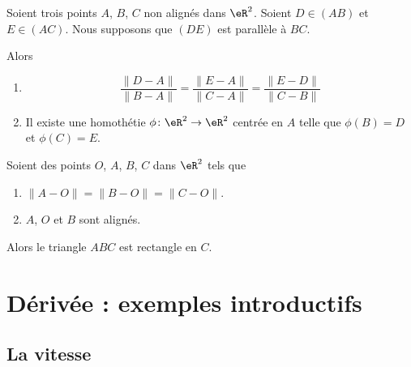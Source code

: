 \begin{theorem}     \label{THOooFMMLooLmAnAd}
	Soient trois points \( A\), \( B\), \( C\) non alignés dans \( \eR^2\). Soient \( D\in (AB)\) et \( E\in (AC)\). Nous supposons que \( (DE)\) est parallèle à \( BC\).

	Alors
	\begin{enumerate}
		\item
		      \begin{equation}
			      \frac{ \| D-A \| }{ \| B-A \| }=\frac{ \| E-A \| }{ \| C-A \| }=\frac{ \| E-D \| }{ \| C-B \| }
		      \end{equation}
		\item
		      Il existe une homothétie \( \phi\colon \eR^2\to \eR^2\) centrée en \( A\) telle que \( \phi(B)=D\) et \( \phi(C)=E\).
	\end{enumerate}
\end{theorem}

\begin{theorem}      \label{THOooGFTWooACQLFJ}
	Soient des points \( O\), \( A\), \( B\), \( C\) dans \( \eR^2\) tels que
	\begin{enumerate}
		\item
		      \( \| A-O \|=\| B-O \|=\| C-O \|\).
		\item
		      \( A\), \( O\) et \( B\) sont alignés.
	\end{enumerate}
	Alors le triangle \( ABC\) est rectangle en \( C\).
\end{theorem}


\section{Dérivée : exemples introductifs}

\subsection{La vitesse}

